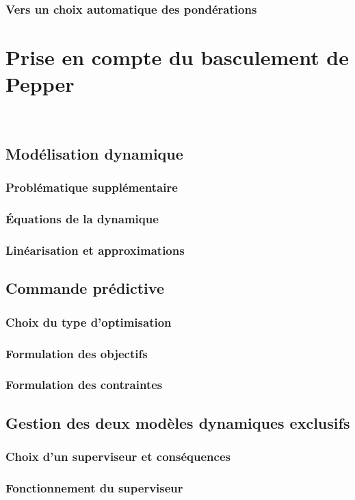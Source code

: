 \documentclass[12pt]{report}
\begin{document}
		\subsection{Vers un choix automatique des pondérations}
\chapter{Prise en compte du basculement de Pepper}~
	\section{Modélisation dynamique}
		\subsection{Problématique supplémentaire}
		\subsection{Équations de la dynamique}
		\subsection{Linéarisation et approximations}
	\section{Commande prédictive}
		\subsection{Choix du type d'optimisation}
		\subsection{Formulation des objectifs}
		\subsection{Formulation des contraintes}
	\section{Gestion des deux modèles dynamiques exclusifs}
		\subsection{Choix d'un superviseur et conséquences}
		\subsection{Fonctionnement du superviseur}
\end{document}
